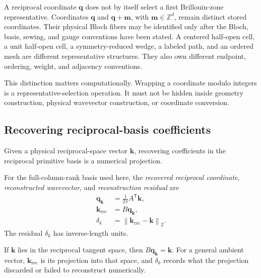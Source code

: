 A reciprocal coordinate $\mathbf q$ does not by itself select a first
Brillouin-zone representative. Coordinates $\mathbf q$ and
$\mathbf q+\mathbf m$, with $\mathbf m\in\mathbb Z^d$, remain distinct stored
coordinates. Their physical Bloch fibers may be identified only after the
Bloch, basis, sewing, and gauge conventions have been stated. A centered
half-open cell, a unit half-open cell, a symmetry-reduced wedge, a labeled path,
and an ordered mesh are different representative structures. They also own
different endpoint, ordering, weight, and adjacency conventions.

This distinction matters computationally. Wrapping a coordinate modulo integers
is a representative-selection operation. It must not be hidden inside geometry
construction, physical wavevector construction, or coordinate conversion.

\subsection{Recovering reciprocal-basis coefficients}

Given a physical reciprocal-space vector $\mathbf k$, recovering coefficients in
the reciprocal primitive basis is a numerical projection.

\begin{definition}
\label{def:training-reciprocal-coordinate-projection}
For the full-column-rank basis used here, the \emph{recovered reciprocal
coordinate}, \emph{reconstructed wavevector}, and \emph{reconstruction
residual} are
\begin{align}
  \mathbf q_{\mathbf k}
  &=\frac{1}{2\pi}A^{\mathsf T}\mathbf k,
  \label{eq:training-reciprocal-coordinate-recovery}\\
  \mathbf k_{\mathrm{rec}}
  &=B\mathbf q_{\mathbf k},
  \label{eq:training-reciprocal-wavevector-reconstruction}\\
  \delta_k
  &=\left\lVert\mathbf k_{\mathrm{rec}}-\mathbf k\right\rVert_2.
  \label{eq:training-reciprocal-coordinate-residual}
\end{align}
The residual $\delta_k$ has inverse-length units.
\end{definition}

If $\mathbf k$ lies in the reciprocal tangent space, then
$B\mathbf q_{\mathbf k}=\mathbf k$. For a general ambient vector,
$\mathbf k_{\mathrm{rec}}$ is its projection into that space, and $\delta_k$
records what the projection discarded or failed to reconstruct numerically.

